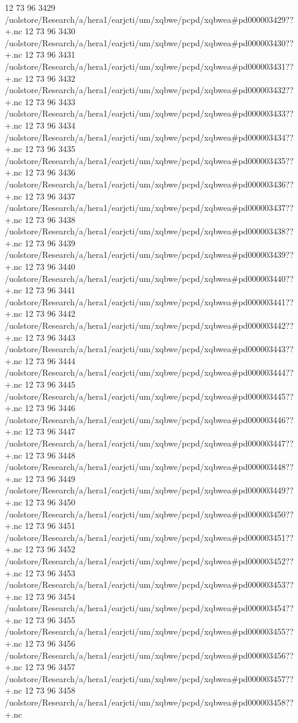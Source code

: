 12 73 96
3429
/uolstore/Research/a/hera1/earjcti/um/xqbwe/pcpd/xqbwea#pd000003429??+.nc
12 73 96
3430
/uolstore/Research/a/hera1/earjcti/um/xqbwe/pcpd/xqbwea#pd000003430??+.nc
12 73 96
3431
/uolstore/Research/a/hera1/earjcti/um/xqbwe/pcpd/xqbwea#pd000003431??+.nc
12 73 96
3432
/uolstore/Research/a/hera1/earjcti/um/xqbwe/pcpd/xqbwea#pd000003432??+.nc
12 73 96
3433
/uolstore/Research/a/hera1/earjcti/um/xqbwe/pcpd/xqbwea#pd000003433??+.nc
12 73 96
3434
/uolstore/Research/a/hera1/earjcti/um/xqbwe/pcpd/xqbwea#pd000003434??+.nc
12 73 96
3435
/uolstore/Research/a/hera1/earjcti/um/xqbwe/pcpd/xqbwea#pd000003435??+.nc
12 73 96
3436
/uolstore/Research/a/hera1/earjcti/um/xqbwe/pcpd/xqbwea#pd000003436??+.nc
12 73 96
3437
/uolstore/Research/a/hera1/earjcti/um/xqbwe/pcpd/xqbwea#pd000003437??+.nc
12 73 96
3438
/uolstore/Research/a/hera1/earjcti/um/xqbwe/pcpd/xqbwea#pd000003438??+.nc
12 73 96
3439
/uolstore/Research/a/hera1/earjcti/um/xqbwe/pcpd/xqbwea#pd000003439??+.nc
12 73 96
3440
/uolstore/Research/a/hera1/earjcti/um/xqbwe/pcpd/xqbwea#pd000003440??+.nc
12 73 96
3441
/uolstore/Research/a/hera1/earjcti/um/xqbwe/pcpd/xqbwea#pd000003441??+.nc
12 73 96
3442
/uolstore/Research/a/hera1/earjcti/um/xqbwe/pcpd/xqbwea#pd000003442??+.nc
12 73 96
3443
/uolstore/Research/a/hera1/earjcti/um/xqbwe/pcpd/xqbwea#pd000003443??+.nc
12 73 96
3444
/uolstore/Research/a/hera1/earjcti/um/xqbwe/pcpd/xqbwea#pd000003444??+.nc
12 73 96
3445
/uolstore/Research/a/hera1/earjcti/um/xqbwe/pcpd/xqbwea#pd000003445??+.nc
12 73 96
3446
/uolstore/Research/a/hera1/earjcti/um/xqbwe/pcpd/xqbwea#pd000003446??+.nc
12 73 96
3447
/uolstore/Research/a/hera1/earjcti/um/xqbwe/pcpd/xqbwea#pd000003447??+.nc
12 73 96
3448
/uolstore/Research/a/hera1/earjcti/um/xqbwe/pcpd/xqbwea#pd000003448??+.nc
12 73 96
3449
/uolstore/Research/a/hera1/earjcti/um/xqbwe/pcpd/xqbwea#pd000003449??+.nc
12 73 96
3450
/uolstore/Research/a/hera1/earjcti/um/xqbwe/pcpd/xqbwea#pd000003450??+.nc
12 73 96
3451
/uolstore/Research/a/hera1/earjcti/um/xqbwe/pcpd/xqbwea#pd000003451??+.nc
12 73 96
3452
/uolstore/Research/a/hera1/earjcti/um/xqbwe/pcpd/xqbwea#pd000003452??+.nc
12 73 96
3453
/uolstore/Research/a/hera1/earjcti/um/xqbwe/pcpd/xqbwea#pd000003453??+.nc
12 73 96
3454
/uolstore/Research/a/hera1/earjcti/um/xqbwe/pcpd/xqbwea#pd000003454??+.nc
12 73 96
3455
/uolstore/Research/a/hera1/earjcti/um/xqbwe/pcpd/xqbwea#pd000003455??+.nc
12 73 96
3456
/uolstore/Research/a/hera1/earjcti/um/xqbwe/pcpd/xqbwea#pd000003456??+.nc
12 73 96
3457
/uolstore/Research/a/hera1/earjcti/um/xqbwe/pcpd/xqbwea#pd000003457??+.nc
12 73 96
3458
/uolstore/Research/a/hera1/earjcti/um/xqbwe/pcpd/xqbwea#pd000003458??+.nc
